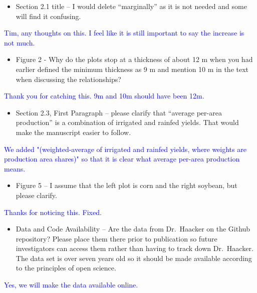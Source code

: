\documentclass[
]{article}
\providecommand{\tightlist}{%
  \setlength{\itemsep}{0pt}\setlength{\parskip}{0pt}}
\begin{document}
\begin{itemize}
\tightlist
\item
  Section 2.1 title -- I would delete ``marginally'' as it is not needed
  and some will find it confusing.
\end{itemize}

\textcolor{blue}{Tim, any thoughts on this. I feel like it is still important to say the increase is not much.}

\begin{itemize}
\tightlist
\item
  Figure 2 - Why do the plots stop at a thickness of about 12 m when you
  had earlier defined the minimum thickness as 9 m and mention 10 m in
  the text when discussing the relationships?
\end{itemize}

\textcolor{blue}{Thank you for catching this. 9m and 10m should have been 12m.}

\begin{itemize}
\tightlist
\item
  Section 2.3, First Paragraph -- please clarify that ``average per-area
  production'' is a combination of irrigated and rainfed yields. That
  would make the manuscript easier to follow.
\end{itemize}

\textcolor{blue}{We added "(weighted-average of irrigated and rainfed yields, where weights are production area shares)" so that it is clear what average per-area production means.}

\begin{itemize}
\tightlist
\item
  Figure 5 -- I assume that the left plot is corn and the right soybean,
  but please clarify.
\end{itemize}

\textcolor{blue}{Thanks for noticing this. Fixed.}

\begin{itemize}
\tightlist
\item
  Data and Code Availability -- Are the data from Dr.~Haacker on the
  Github repository? Please place them there prior to publication so
  future investigators can access them rather than having to track down
  Dr.~Haacker. The data set is over seven years old so it should be made
  available according to the principles of open science.
\end{itemize}

\textcolor{blue}{Yes, we will make the data available online.}
\end{document}
